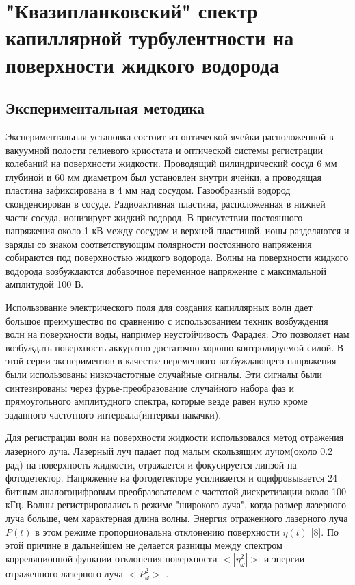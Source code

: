 \chapter{"Квазипланковский" спектр капиллярной турбулентности на поверхности жидкого водорода}
\section{Экспериментальная методика} %
 Экспериментальная установка состоит из оптической ячейки расположенной в вакуумной полости гелиевого криостата и оптической системы регистрации колебаний на поверхности жидкости. Проводящий цилиндрический сосуд 6 мм глубиной и 60 мм диаметром был установлен внутри ячейки, а проводящая пластина зафиксирована в 4 мм над сосудом. Газообразный водород сконденсирован в сосуде. Радиоактивная пластина, расположенная в нижней части сосуда, ионизирует жидкий водород. В присутствии постоянного напряжения около 1 кВ между сосудом и верхней пластиной, ионы разделяются и заряды со знаком соответствующим полярности постоянного напряжения собираются под поверхностью жидкого водорода. Волны на поверхности жидкого водорода возбуждаются добавочное переменное напряжение с максимальной амплитудой 100 В.

	Использование электрического поля для создания капиллярных волн дает большое преимущество по сравнению с использованием техник возбуждения волн на поверхности воды, например неустойчивость Фарадея. Это позволяет нам возбуждать поверхность аккуратно достаточно хорошо контролируемой силой. В этой серии экспериментов в качестве переменного возбуждающего напряжения были использованы низкочастотные случайные сигналы. Эти сигналы были синтезированы через фурье-преобразование случайного набора фаз и прямоугольного амплитудного спектра, которые везде равен нулю кроме заданного частотного интервала(интервал накачки).

	Для регистрации волн на поверхности жидкости использовался метод отражения лазерного луча. Лазерный луч падает под малым скользящим лучом(около 0.2 рад) на поверхность жидкости, отражается и фокусируется линзой на фотодетектор. Напряжение на фотодетекторе усиливается и оцифровывается 24 битным аналогоцифровым преобразователем с частотой дискретизации около 100 кГц. Волны регистрировались в режиме "широкого луча", когда размер лазерного луча больше, чем характерная длина волны. Энергия отраженного лазерного луча $P(t)$  в этом режиме пропорциональна отклонению поверхности $\eta(t)$ [8]. По этой причине в дальнейшем не делается разницы между спектром корреляционной функции отклонения поверхности $<|\eta_\omega^2|>$ и энергии отраженного лазерного луча $<P_\omega^2>$ .

